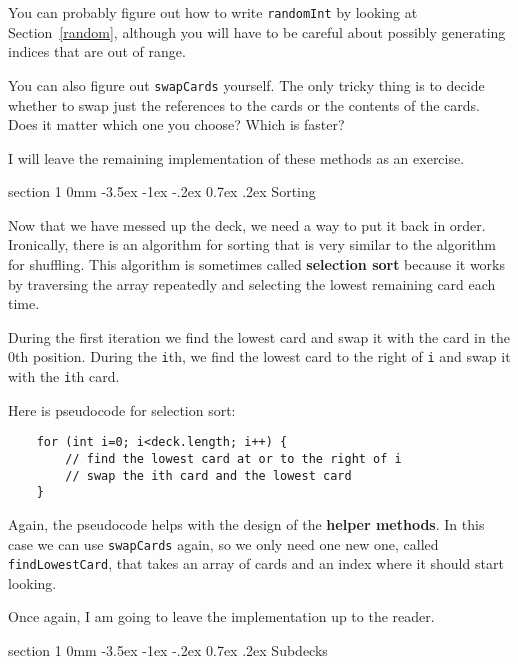 \documentclass{book}
\makeatletter
\renewcommand{\section}{\@startsection 
    {section} {1} {0mm}%
    {-3.5ex \@plus -1ex \@minus -.2ex}%
    {0.7ex \@plus.2ex}%
    {\normalfont\Large\bfseries}}
\makeatother
\begin{document}

You can probably figure out how to write {\tt randomInt}
by looking at Section~\ref{random}, although you will have to
be careful about possibly generating indices that are out of range.


You can also figure out {\tt swapCards} yourself.  The only
tricky thing is to decide whether to swap just the references
to the cards or the contents of the cards.  Does it matter
which one you choose?  Which is faster?

I will leave the remaining implementation of these methods
as an exercise.


\section{Sorting}
\label{sorting}

Now that we have messed up the deck, we need a way to put it
back in order.  Ironically, there is an algorithm for
sorting that is very similar to the algorithm for shuffling.
This algorithm is sometimes called {\bf selection sort}
because it works by traversing the array repeatedly and 
selecting the lowest remaining card each time.


During the first iteration we find the lowest card and swap
it with the card in the 0th position.  During the {\tt i}th, we find the
lowest card to the right of {\tt i} and swap it with the {\tt i}th
card.

Here is pseudocode for selection sort:

\begin{verbatim}
    for (int i=0; i<deck.length; i++) {
        // find the lowest card at or to the right of i
        // swap the ith card and the lowest card
    }
\end{verbatim}
%
Again, the pseudocode helps with the design of the {\bf helper
methods}.  In this case we can use {\tt swapCards} again,
so we only need one new one, called {\tt findLowestCard},
that takes an array of cards and an index where it should
start looking.


Once again, I am going to leave the implementation up to
the reader.


\section {Subdecks}
\end{document}
